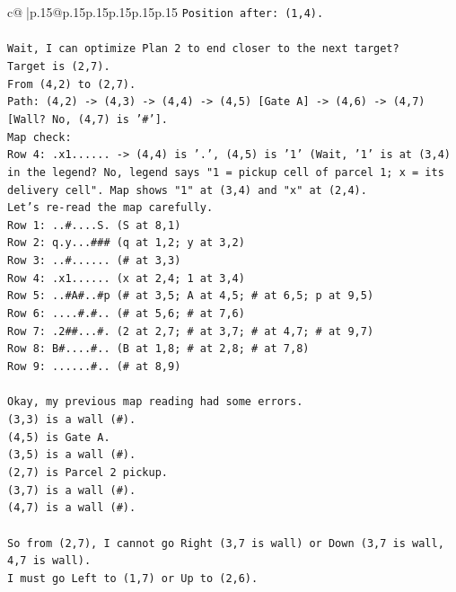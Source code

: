 \documentclass{article}
\begin{document}
{\begin{supertabular}{c@{$\;$}|p{.15\linewidth}@{}p{.15\linewidth}p{.15\linewidth}p{.15\linewidth}p{.15\linewidth}p{.15\linewidth}}
{{{\texttt{Position after: (1,4).} \\
\\ 
\texttt{Wait, I can optimize Plan 2 to end closer to the next target?} \\
\texttt{Target is (2,7).} \\
\texttt{From (4,2) to (2,7).} \\
\texttt{Path: (4,2) {-}> (4,3) {-}> (4,4) {-}> (4,5) {[}Gate A{]} {-}> (4,6) {-}> (4,7) {[}Wall? No, (4,7) is '\#'{]}.} \\
\texttt{Map check:} \\
\texttt{Row 4: .x1...... {-}> (4,4) is '.', (4,5) is '1' (Wait, '1' is at (3,4) in the legend? No, legend says "1 = pickup cell of parcel 1; x = its delivery cell". Map shows "1" at (3,4) and "x" at (2,4).} \\
\texttt{Let's re{-}read the map carefully.} \\
\texttt{Row 1: ..\#....S. (S at 8,1)} \\
\texttt{Row 2: q.y...\#\#\# (q at 1,2; y at 3,2)} \\
\texttt{Row 3: ..\#...... (\# at 3,3)} \\
\texttt{Row 4: .x1...... (x at 2,4; 1 at 3,4)} \\
\texttt{Row 5: ..\#A\#..\#p (\# at 3,5; A at 4,5; \# at 6,5; p at 9,5)} \\
\texttt{Row 6: ....\#.\#.. (\# at 5,6; \# at 7,6)} \\
\texttt{Row 7: .2\#\#...\#. (2 at 2,7; \# at 3,7; \# at 4,7; \# at 9,7)} \\
\texttt{Row 8: B\#....\#.. (B at 1,8; \# at 2,8; \# at 7,8)} \\
\texttt{Row 9: ......\#.. (\# at 8,9)} \\
\\ 
\texttt{Okay, my previous map reading had some errors.} \\
\texttt{(3,3) is a wall (\#).} \\
\texttt{(4,5) is Gate A.} \\
\texttt{(3,5) is a wall (\#).} \\
\texttt{(2,7) is Parcel 2 pickup.} \\
\texttt{(3,7) is a wall (\#).} \\
\texttt{(4,7) is a wall (\#).} \\
\\ 
\texttt{So from (2,7), I cannot go Right (3,7 is wall) or Down (3,7 is wall, 4,7 is wall).} \\
\texttt{I must go Left to (1,7) or Up to (2,6).} \\
}}}
\end{supertabular}}
\end{document}
